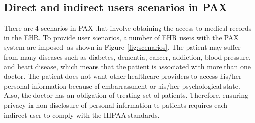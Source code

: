\documentclass[journal,article,submit,moreauthors,pdftex]{Definitions/mdpi}
\begin{document}
\subsection{Direct and indirect users scenarios in PAX}
There are 4 scenarios in PAX that involve obtaining the access to medical 
records in the EHR. 
To provide user scenarios, a number of EHR users with the PAX system are imposed, 
as shown in Figure~\ref{fig:scenarios}. The patient may suffer from many diseases 
such as diabetes, dementia, cancer, addiction, blood pressure, and heart disease, 
which means that the patient is associated with more than one doctor. The patient 
does not want other healthcare providers to access his/her personal information 
because of embarrassment or his/her psychological state. Also, the doctor has an 
obligation of treating set of patients. Therefore, ensuring privacy in non-disclosure 
of personal information to patients requires each indirect user to comply with 
the HIPAA standards.
\end{document}
